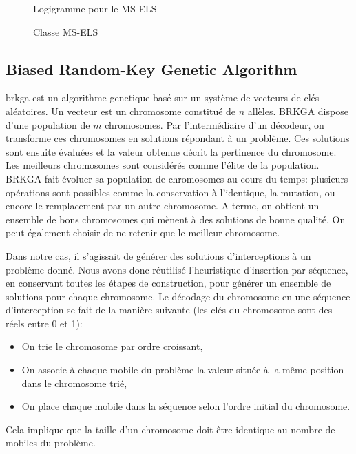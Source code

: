 			\begin{figure}[H]
				\centering
				\begin{tikzpicture}[node distance=1cm]
					
				\end{tikzpicture}
				\caption{Logigramme pour le MS-ELS}
				\label{fig:ms-els-logigram}
			\end{figure}

			\begin{figure}[H]			
				\centering
				\begin{tikzpicture}
					
				\end{tikzpicture}
				\caption[UML -- Métaheuristique MS-ELS]{Classe MS-ELS}
				\label{uml:ms-els}
			\end{figure}

		\subsection{Biased Random-Key Genetic Algorithm}
			\Gls{brkga} est un \gls{algorithme genetique} basé sur un système de vecteurs de clés aléatoires. Un vecteur est un chromosome constitué de $n$ allèles. BRKGA dispose d'une population de $m$ chromosomes. Par l'intermédiaire d'un décodeur, on transforme ces chromosomes en solutions répondant à un problème. Ces solutions sont ensuite évaluées et la valeur obtenue décrit la pertinence du chromosome. Les meilleurs chromosomes sont considérés comme l'élite de la population. BRKGA fait évoluer sa population de chromosomes au cours du temps: plusieurs opérations sont possibles comme la conservation à l'identique, la mutation, ou encore le remplacement par un autre chromosome. A terme, on obtient un ensemble de bons chromosomes qui mènent à des solutions de bonne qualité. On peut également choisir de ne retenir que le meilleur chromosome.

			Dans notre cas, il s'agissait de générer des solutions d'interceptions à un problème donné. Nous avons donc réutilisé l'heuristique d'insertion par séquence, en conservant toutes les étapes de construction, pour générer un ensemble de solutions pour chaque chromosome.
			Le décodage du chromosome en une séquence d'interception se fait de la manière suivante (les clés du chromosome sont des réels entre 0 et 1):
			\begin{itemize}
				\item On trie le chromosome par ordre croissant,
				\item On associe à chaque mobile du problème la valeur située à la même position dans le chromosome trié,
				\item On place chaque mobile dans la séquence selon l'ordre initial du chromosome.
			\end{itemize}
			Cela implique que la taille d'un chromosome doit être identique au nombre de mobiles du problème.

